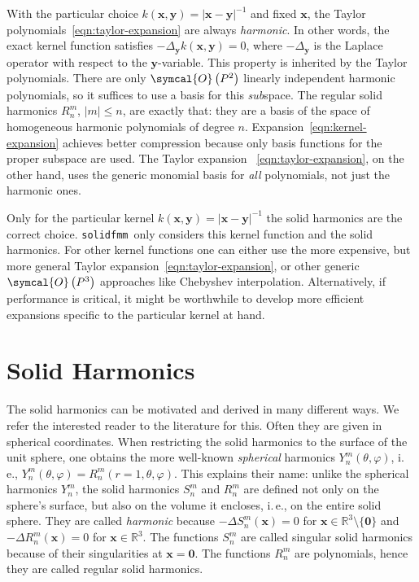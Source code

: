 \documentclass{scrbook}
\newcommand{\solidfmm}{\texttt{solidfmm}}
\newcommand{\reals}{\ensuremath{\mathbb{R}}}
\newcommand{\wholespace}{\ensuremath{\reals^3}}
\newcommand{\vv}[1]{\ensuremath{\symbf{#1}}} %
\newcommand{\bigO}[1]{\ensuremath{\symcal{O}\left({#1}\right)}}
\begin{document}
With the particular choice $k(\vv{x},\vv{y})=|\vv{x}-\vv{y}|^{-1}$ and fixed
$\vv{x}$, the Taylor polynomials~\eqref{eqn:taylor-expansion} are always
\emph{harmonic}. In other words, the exact kernel function satisfies
$-\Delta_{\vv{y}}k(\vv{x},\vv{y})=0$, where $-\Delta_{\vv{y}}$ is the Laplace
operator with respect to the $\vv{y}$-variable. This property is inherited by
the Taylor polynomials. There are only \bigO{P^2} linearly independent harmonic
polynomials, so it suffices to use a basis for this \emph{sub}space. The regular
solid harmonics $R_n^m$, $|m|\leq n$, are exactly that: they are a basis of the
space of homogeneous harmonic polynomials of degree $n$. 
Expansion~\eqref{eqn:kernel-expansion} achieves better compression because only
basis functions for the proper subspace are used. The Taylor expansion~%
\eqref{eqn:taylor-expansion}, on the other hand, uses the generic monomial
basis for \emph{all} polynomials, not just the harmonic ones.

Only for the particular kernel $k(\vv{x},\vv{y})=|\vv{x}-\vv{y}|^{-1}$ the
solid harmonics are the correct choice. \solidfmm\ only considers this
kernel function and the solid harmonics. For other kernel functions one can
either use the more expensive, but more general Taylor
expansion~\eqref{eqn:taylor-expansion}, or other generic $\bigO{P^3}$ approaches
like Chebyshev interpolation. Alternatively, if performance is critical, it
might be worthwhile to develop more efficient expansions specific to the
particular kernel at hand.

\section{Solid Harmonics}\label{sec:solidharmonics}
The solid harmonics can be motivated and derived in many different ways. We
refer the interested reader to the literature for this. Often they are given
in spherical coordinates. When restricting the solid harmonics to the surface
of the unit sphere, one obtains the more well-known \emph{spherical} harmonics
$Y_n^m(\theta,\varphi)$, i.\,e., $Y_n^m(\theta,\varphi)=
R_n^m(r=1,\theta,\varphi)$. This explains their name: unlike the spherical
harmonics $Y_n^m$, the solid harmonics $S_n^m$ and $R_n^m$ are defined not only
on the sphere's surface, but also on the volume it encloses, i.\,e., on the
entire solid sphere. They are called \emph{harmonic} because
$-\Delta S_n^m(\vv{x}) = 0$ for
$\vv{x}\in\wholespace\setminus\lbrace\vv{0}\rbrace$ and
$-\Delta R_n^m(\vv{x}) = 0$ for $\vv{x}\in\wholespace$. The functions $S_n^m$
are called singular solid harmonics because of their singularities at
$\vv{x}=\vv{0}$. The functions $R_n^m$ are polynomials, hence they are called
regular solid harmonics.
\end{document}
